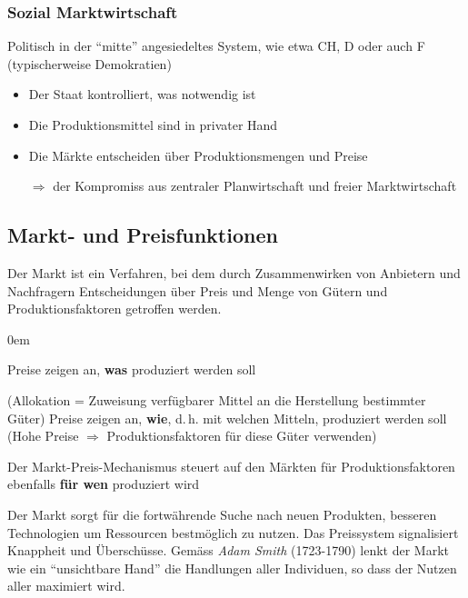 \subsubsection{Sozial Marktwirtschaft}
Politisch in der \enquote{mitte} angesiedeltes System, wie etwa CH, D oder auch F (typischerweise Demokratien)
\begin{itemize}\itemsep0em
	\item Der Staat kontrolliert, was notwendig ist
	\item Die Produktionsmittel sind in privater Hand
	\item Die Märkte entscheiden über Produktionsmengen und Preise
	\item [$\Rightarrow$] der Kompromiss aus zentraler Planwirtschaft und freier Marktwirtschaft
\end{itemize}


\subsection{Markt- und Preisfunktionen}
Der Markt ist ein Verfahren, bei dem durch Zusammenwirken von Anbietern und Nachfragern Entscheidungen über Preis und Menge von Gütern und Produktionsfaktoren getroffen werden.

\begin{description}\itemsep0em
	\item [Informationsträger] Preise zeigen an, \textbf{was} produziert werden soll
	\item [Steuerung und Allokation] (Allokation = Zuweisung verfügbarer Mittel an die Herstellung bestimmter Güter) Preise zeigen an, \textbf{wie}, d.\,h. mit
	welchen Mitteln, produziert werden soll (Hohe Preise $\Rightarrow$ Produktionsfaktoren für diese Güter verwenden)
	\item [Koordination] Der Markt-Preis-Mechanismus steuert auf den Märkten für Produktionsfaktoren ebenfalls \textbf{für wen} produziert wird
\end{description}

Der Markt sorgt für die fortwährende Suche nach neuen Produkten, besseren Technologien um Ressourcen bestmöglich zu nutzen. Das Preissystem
signalisiert Knappheit und Überschüsse. Gemäss \textit{Adam Smith} (1723-1790) lenkt der Markt wie ein \enquote{unsichtbare Hand} die Handlungen aller Individuen, so dass der Nutzen aller
maximiert wird.


